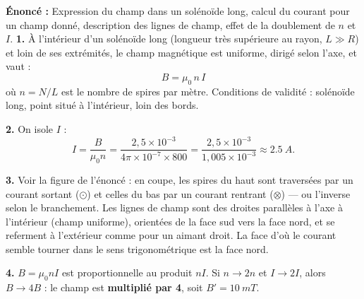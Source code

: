 \documentclass[11pt]{article}
\newcommand{\cle}[1]{{\popxbold\color{popdark}#1}}
\begin{document}
\begin{corrige}
\textbf{Énoncé :} Expression du champ dans un solénoïde long, calcul du courant pour un champ donné, description des lignes de champ, effet de la doublement de $n$ et $I$.
\tcblower
\textbf{1.} À l'intérieur d'un solénoïde \cle{long} (longueur très supérieure au rayon, $L \gg R$) et loin de ses extrémités, le champ magnétique est uniforme, dirigé selon l'axe, et vaut :
\[ B = \mu_0\, n\, I \]
où $n = N/L$ est le nombre de spires par mètre. Conditions de validité : solénoïde long, point situé à l'intérieur, loin des bords.

\textbf{2.} On isole $I$ :
\[ I = \frac{B}{\mu_0 n} = \frac{2{,}5\times 10^{-3}}{4\pi\times 10^{-7} \times 800} = \frac{2{,}5\times 10^{-3}}{1{,}005\times 10^{-3}} \approx \SI{2,5}{A}. \]

\textbf{3.} Voir la figure de l'énoncé : en coupe, les spires du haut sont traversées par un courant sortant ($\odot$) et celles du bas par un courant rentrant ($\otimes$) — ou l'inverse selon le branchement. Les lignes de champ sont des droites parallèles à l'axe à l'intérieur (champ uniforme), orientées de la face sud vers la face nord, et se referment à l'extérieur comme pour un aimant droit. La face d'où le courant semble tourner dans le sens trigonométrique est la face \cle{nord}.

\textbf{4.} $B = \mu_0 n I$ est proportionnelle au produit $nI$. Si $n \to 2n$ et $I \to 2I$, alors $B \to 4B$ : le champ est \textbf{multiplié par 4}, soit $B' = \SI{10}{mT}$.
\end{corrige}
\end{document}
